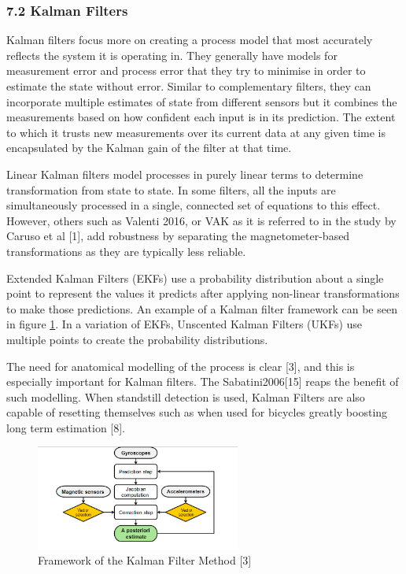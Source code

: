 \documentclass[10pt]{report}
\begin{document}
\subsubsection{7.2 Kalman Filters}
Kalman filters focus more on creating a process model that most accurately reflects the system it is operating in. They generally have models for measurement error and process error that they try to minimise in order to estimate the state without error. Similar to complementary filters, they can incorporate multiple estimates of state from different sensors but it combines the measurements based on how confident each input is in its prediction. The extent to which it trusts new measurements over its current data at any given time is encapsulated by the Kalman gain of the filter at that time.

Linear Kalman filters model processes in purely linear terms to determine transformation from state to state. In some filters, all the inputs are simultaneously processed in a single, connected set of equations to this effect. However, others such as Valenti 2016, or VAK as it is referred to in the study by Caruso et al [1], add robustness by separating the magnetometer-based transformations as they are typically less reliable.

Extended Kalman Filters (EKFs) use a probability distribution about a single point to represent the values it predicts after applying non-linear transformations to make those predictions. An example of a Kalman filter framework can be seen in figure \ref{fig:kfs}. In a variation of EKFs, Unscented Kalman Filters (UKFs) use multiple points to create the probability distributions.

The need for anatomical modelling of the process is clear [3], and this is especially important for Kalman filters. The Sabatini2006[15] reaps the benefit of such modelling. When standstill detection is used, Kalman Filters are also capable of resetting themselves such as when used for bicycles greatly boosting long term estimation [8].


\begin{figure}[!h]
  \caption{Framework of the Kalman Filter Method [3]}
  \centering
  \label{fig:kfs}
  \includegraphics[width=0.6\textwidth]{kf.PNG}
\end{figure}
\end{document}
